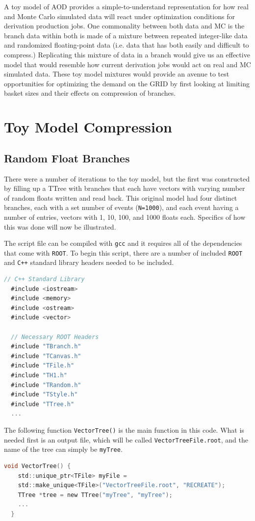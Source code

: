A toy model of AOD provides a simple-to-understand representation for how real and Monte Carlo simulated data will react under optimization conditions for derivation production jobs. 
One commonality between both data and MC is the branch data within both is made of a mixture between repeated integer-like data and randomized floating-point data (i.e. data that has both easily and difficult to compress.)
Replicating this mixture of data in a branch would give us an effective model that would resemble how current derivation jobs would act on real and MC simulated data. 
These toy model mixtures would provide an avenue to test opportunities for optimizing the demand on the GRID by first looking at limiting basket sizes and their effects on compression of branches. 


\section{Toy Model Compression}

\subsection{Random Float Branches} \label{sec:toy_compression_random_float_branches}
There were a number of iterations to the toy model, but the first was constructed by filling up a TTree with branches that each have vectors with varying number of random floats written and read back.
This original model had four distinct branches, each with a set number of events (\verb|N=1000|), and each event having a number of entries, vectors with 1, 10, 100, and 1000 floats each.
Specifics of how this was done will now be illustrated.

The script file can be compiled with \verb|gcc| and it requires all of the dependencies that come with \verb|ROOT|. 
To begin this script, there are a number of included \verb|ROOT| and \verb|C++| standard library headers needed to be included. 
\begin{lstlisting}[language=C]
  // C++ Standard Library
  #include <iostream>
  #include <memory>
  #include <ostream>
  #include <vector>
  
  // Necessary ROOT Headers
  #include "TBranch.h"
  #include "TCanvas.h"
  #include "TFile.h"
  #include "TH1.h"
  #include "TRandom.h"
  #include "TStyle.h"
  #include "TTree.h"
  ...
\end{lstlisting}


The following function \verb|VectorTree()| is the main function in this code.
What is needed first is an output file, which will be called \verb|VectorTreeFile.root|, and the name of the tree can simply be \verb|myTree|.
\begin{lstlisting}[language=C]
  void VectorTree() {
    std::unique_ptr<TFile> myFile =
    std::make_unique<TFile>("VectorTreeFile.root", "RECREATE");
    TTree *tree = new TTree("myTree", "myTree");
    ...
  }
\end{lstlisting}

